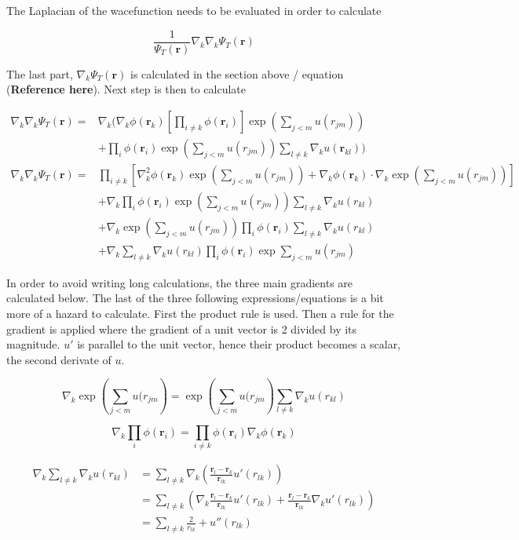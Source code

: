 \documentclass[
]{article}
\begin{document}
The Laplacian of the wacefunction needs to be evaluated in order to
calculate

\[
\frac{1}{\Psi_T(\mathbf {r})} \nabla_k \nabla_k \Psi_T(\mathbf{r})
\]

The last part, \(\nabla_k \Psi_T(\mathbf{r})\) is calculated in the
section above / equation (\textbf{Reference here}). Next step is then to
calculate

\begin{align*}
\nabla_k \nabla_k \Psi_T(\mathbf{r}) = &\nabla_k \bigg( \nabla_k \phi(\mathbf r_k) \left [\prod_{i\ne k} \phi(\mathbf r_i) \right] \exp{\left (\sum_{j<m}u(r_{jm})\right)} \\
 &+ \prod_i \phi (\mathbf r_i) \exp{\left(\sum_{j<m} u(r_{jm}) \right)}  \sum_{l \ne k} \nabla_k  u(\mathbf r_{kl}) \bigg) \\
\nabla_k \nabla_k \Psi_T(\mathbf r) = &\prod_{i\ne k} \left[ \nabla_k^2 \phi(\mathbf r_k) \exp{\left(\sum_{j<m} u(r_{jm})\right)} + \nabla_k \phi(\mathbf r_k) \cdot  \nabla_k \exp{\left( \sum_{j < m} u(r_{jm})\right)} \right] \\ &+ \nabla_k \prod_i \phi (\mathbf r_i) \exp{\left (\sum _{j<m} u(r_{jm})\right)}\sum_{l \ne k} \nabla_k u(r_{kl}) \\ &+
\nabla_k \exp{\left(\sum_{j < m} u(r_{jm})\right)}\prod_i \phi(\mathbf{r}_i) \sum_{l \ne k} \nabla_k u(r_{kl}) \\ &+ \nabla_k \sum_{l \ne k} \nabla_k u (r_{kl}) \prod_i \phi (\mathbf{r}_i) \exp{\sum_{j < m} u (r_{jm})}
\end{align*}

In order to avoid writing long calculations, the three main gradients
are calculated below. The last of the three following
expressions/equations is a bit more of a hazard to calculate. First the
product rule is used. Then a rule for the gradient is applied where the
gradient of a unit vector is 2 divided by its magnitude. \(u'\) is
parallel to the unit vector, hence their product becomes a scalar, the
second derivate of \(u\).

\[
\nabla_k
\exp{\left(\sum_{j <m}{u(r_{jm}}\right)} = \exp{\left(\sum_{j <m}{u(r_{jm}}\right)} \sum_{l \ne k}{\nabla_k u(r_{kl})}
\]

\[
\nabla_k \prod_i \phi(\mathbf{r}_i) = \prod _{i \ne k} \phi(\mathbf{r}_i) \nabla_k \phi(\mathbf {r}_k)
\]

\begin{align*}
\nabla_k \sum_{l \ne k}{\nabla_k u(r_{kl})} &= \sum_{l \ne k}{\nabla_k \left(\frac{\mathbf{r}_l - \mathbf {r}_k}{\mathbf{r} _{lk}} u'(r _{lk})\right)} \\ &= \sum _{l\ne k}\left(\nabla_k \frac{\mathbf{r}_l - \mathbf {r}_k}{\mathbf{r} _{lk}} u'(r _{lk}) + \frac{\mathbf{r}_l - \mathbf {r}_k}{\mathbf{r} _{lk}} \nabla_k u'(r _{lk}) \right) \\ &= \sum _{l\ne k} \frac{2}{r _{lk}} + u''(r _{lk})
\end{align*}
\end{document}
